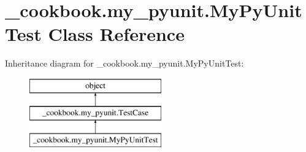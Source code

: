 \hypertarget{class__cookbook_1_1my__pyunit_1_1MyPyUnitTest}{\section{\-\_\-cookbook.\-my\-\_\-pyunit.\-My\-Py\-Unit\-Test Class Reference}
\label{class__cookbook_1_1my__pyunit_1_1MyPyUnitTest}
}
Inheritance diagram for \-\_\-cookbook.\-my\-\_\-pyunit.\-My\-Py\-Unit\-Test\-:\begin{figure}[H]
\begin{center}
\leavevmode
\includegraphics[height=3.000000cm]{d3/da6/class__cookbook_1_1my__pyunit_1_1MyPyUnitTest}
\end{center}
\end{figure}
